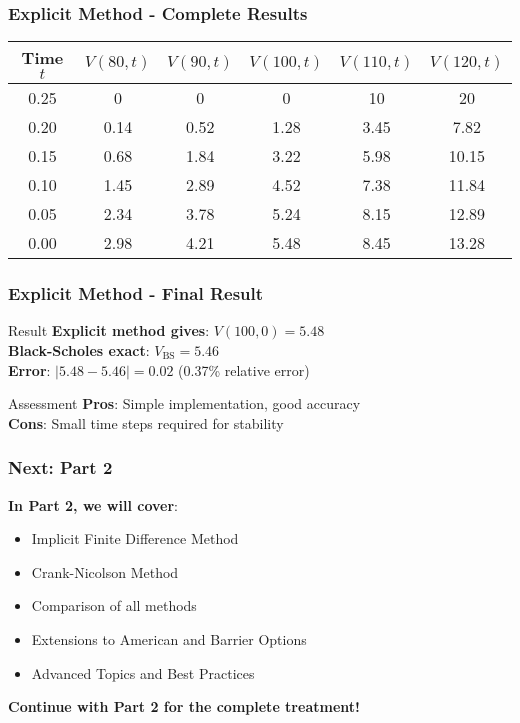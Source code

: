 \documentclass[aspectratio=169]{beamer}
\begin{document}
\begin{frame}
\frametitle{Explicit Method - Complete Results}
\begin{center}
\begin{tabular}{c|c|c|c|c|c}
Time \(t\) & \(V(80,t)\) & \(V(90,t)\) & \(V(100,t)\) & \(V(110,t)\) & \(V(120,t)\) \\
\hline
0.25 & 0 & 0 & 0 & 10 & 20 \\
0.20 & 0.14 & 0.52 & 1.28 & 3.45 & 7.82 \\
0.15 & 0.68 & 1.84 & 3.22 & 5.98 & 10.15 \\
0.10 & 1.45 & 2.89 & 4.52 & 7.38 & 11.84 \\
0.05 & 2.34 & 3.78 & 5.24 & 8.15 & 12.89 \\
0.00 & 2.98 & 4.21 & 5.48 & 8.45 & 13.28 \\
\end{tabular}
\end{center}
\end{frame}

\begin{frame}
\frametitle{Explicit Method - Final Result}
\begin{block}{Result}
\textbf{Explicit method gives}: \(V(100, 0) = 5.48\)\\
\textbf{Black-Scholes exact}: \(V_{\text{BS}} = 5.46\)\\
\textbf{Error}: \(|5.48 - 5.46| = 0.02\) (0.37\% relative error)
\end{block}

\begin{block}{Assessment}
\textbf{Pros}: Simple implementation, good accuracy\\
\textbf{Cons}: Small time steps required for stability
\end{block}
\end{frame}

\begin{frame}
\frametitle{Next: Part 2}
\textbf{In Part 2, we will cover}:
\begin{itemize}
\item Implicit Finite Difference Method
\item Crank-Nicolson Method
\item Comparison of all methods
\item Extensions to American and Barrier Options
\item Advanced Topics and Best Practices
\end{itemize}

\textbf{Continue with Part 2 for the complete treatment!}
\end{frame}
\end{document}
